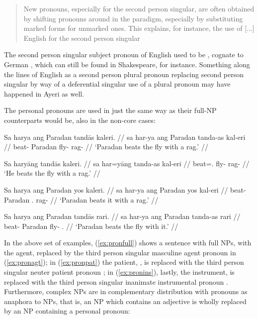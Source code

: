 \blockcquote[42]{lehmann2015}{New pronouns, especially for the second person 
singular, are often obtained by shifting pronouns around in the paradigm,
especially by substituting marked forms for unmarked ones. This explains, for
instance, the use of [...] English  for the second person singular}

The second person singular subject pronoun of English used to be , 
cognate to German , which can still be found in Shakespeare, for 
instance. Something along the lines of English  as a second 
person plural pronoun replacing second person singular  by way of a 
deferential singular use of a plural pronoun \citep[you, pron., adj., and 
n.]{oed} may have happened in Ayeri as well.

The personal pronouns are used in just the same way as their full-NP 
counterparts would be, also in the non-core cases:

\pex\label{ex:perspro}
\a\label{ex:pronfull}\begingl
	\gla Sa harya ang Paradan tandās kaleri. //
	\glb sa har-ya ang Paradan tanda-as kal-eri //
	\glc \AgtT{} beat-\TsgM{} \Aarg{} Paradan fly-\Parg{} rag-\Ins{} //
	\glft `Paradan beats the fly with a rag.' //
\endgl

\a\label{ex:pronagt}\begingl
	\gla Sa haryāng tandās kaleri. //
	\glb sa har=yāng tanda-as kal-eri //
	\glc \AgtT{} beat=\TsgM{}.\Aarg{} fly-\Parg{} rag-\Ins{} //
	\glft `He beats the fly with a rag.' //
\endgl

\a\label{ex:pronpat}\begingl
	\gla Sa harya ang Paradan yos kaleri. //
	\glb sa har-ya ang Paradan yos kal-eri //
	\glc \AgtT{} beat-\TsgM{} \Aarg{} Paradan \TsgN{}.\Parg{} rag-\Ins{} //
	\glft `Paradan beats it with a rag.' //
\endgl

\a\label{ex:pronins}\begingl
	\gla Sa harya ang Paradan tandās rari. //
	\glb sa har-ya ang Paradan tanda-as rari //
	\glc \AgtT{} beat-\TsgM{} \Aarg{} Paradan fly-\Parg{} \TsgI{}.\Ins{} //
	\glft `Paradan beats the fly with it.' //
\endgl

\xe

In the above set of examples, (\ref{ex:pronfull}) shows a sentence with full
NPs, with the agent,  replaced by the third person
singular masculine agent pronoun  in (\ref{ex:pronagt}); in
(\ref{ex:pronpat}) the patient, , is replaced with the
third person singular neuter patient pronoun ; in
(\ref{ex:pronins}), lastly, the instrument,  is replaced
with the third person singular inanimate instrumental pronoun .
Furthermore, complex NPs are in complementary distribution with pronouns as
anaphora to NPs, that is, an NP which contains an adjective is wholly replaced
by an NP containing a personal pronoun:

